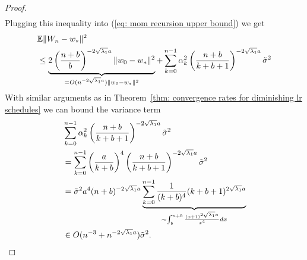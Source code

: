 \begin{proof}
\begin{align*}
	\end{align*}
	Plugging this inequality into (\ref{eq: mom recursion upper bound}) we
	get
	\begin{align*}
		&\mathbb{E}\|W_n-w_*\|^2\\
		&\le\underbrace{
			2\left(\frac{n+b}{b}\right)^{-2\sqrt{\lambda_1}a}\|w_0 - w_*\|^2
		}_{
			=O(n^{-2\sqrt{\lambda_1}a})\|w_0-w_*\|^2
		}
		+ \sum_{k=0}^{n-1}\alpha_k^2 
		\left(\frac{n+b}{k+b+1}\right)^{-2\sqrt{\lambda_1} a} \tilde{\sigma}^2
	\end{align*}
	With similar arguments as in Theorem~\ref{thm: convergence rates for diminishing lr schedules}
	we can bound the variance term
	\begin{align*}
		&\sum_{k=0}^{n-1}\alpha_k^2 
		\left(\frac{n+b}{k+b+1}\right)^{-2\sqrt{\lambda_1} a} \tilde{\sigma}^2\\
		&=\sum_{k=0}^{n-1}\left(\frac{a}{k+b}\right)^4 
		\left(\frac{n+b}{k+b+1}\right)^{-2\sqrt{\lambda_1} a} \tilde{\sigma}^2\\
		&= \tilde{\sigma}^2 a^4 (n+b)^{-2\sqrt{\lambda_1}a}
		\underbrace{
			\sum_{k=0}^{n-1}\frac{1}{(k+b)^4}(k+b+1)^{2\sqrt{\lambda_1} a}
		}_{
			\sim\int_b^{n+b}\frac{(x+1)^{2\sqrt{\lambda_1}a}}{x^4}dx
		}\\
		&\in O(n^{-3} + n^{-2\sqrt{\lambda_1}a})\tilde{\sigma}^2.
	\end{align*}
\end{proof}








\endinput
